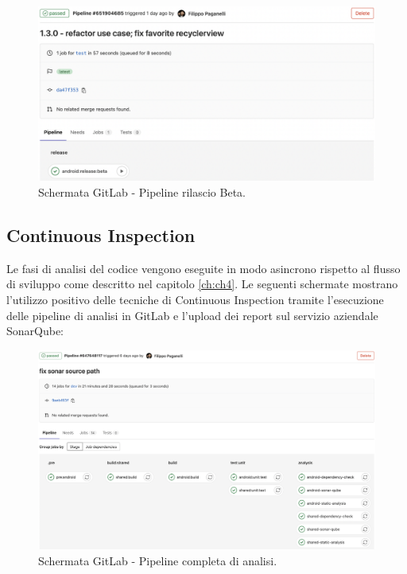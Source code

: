\begin{figure}[H]
\centering
    \includegraphics[width=1\textwidth]{img/Screenshot 2022-09-28 at 16.11.22.png}
    \caption{Schermata GitLab - Pipeline rilascio Beta.}
    \label{betarelease}
\end{figure}

\subsection{Continuous Inspection}
Le fasi di analisi del codice vengono eseguite in modo asincrono rispetto al flusso di sviluppo come descritto nel capitolo \ref{ch:ch4}. Le seguenti schermate mostrano l'utilizzo positivo delle tecniche di Continuous Inspection tramite l'esecuzione delle pipeline di analisi in GitLab e l'upload dei report sul servizio aziendale SonarQube:
\begin{figure}[H]
\centering
    \includegraphics[width=1\textwidth]{img/Screenshot 2022-09-28 at 16.15.34.png}
    \caption{Schermata GitLab - Pipeline completa di analisi.}
    \label{fullpipeline}
\end{figure}

